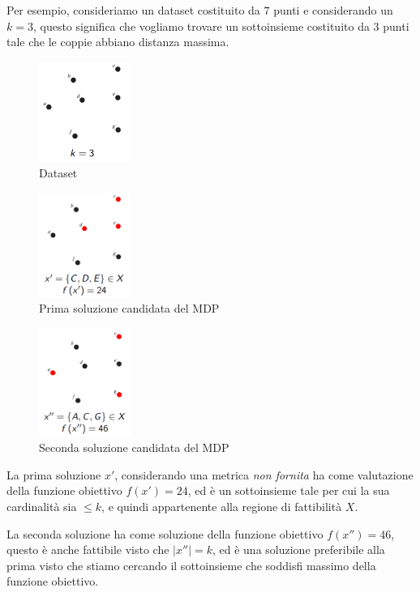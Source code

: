 \documentclass{article}
\begin{document}
Per esempio, consideriamo un dataset costituito da $7$ punti e considerando un $k=3$, questo significa che vogliamo trovare
un sottoinsieme costituito da $3$ punti tale che le coppie abbiano distanza massima.

\begin{figure}[H]
    \centering
    \includegraphics[width=3cm]{images/graph_MDP.png}
    \caption{Dataset}
    \label{fig:graph_MDP}
\end{figure}

\begin{figure}[H]
    \centering
    \includegraphics[width=3cm]{images/sol1_MDP.png}
    \caption{Prima soluzione candidata del MDP}
    \label{fig:cand_sol_MDP}
\end{figure}

\begin{figure}[H]
    \centering
    \includegraphics[width=3cm]{images/sol_MDP.png}
    \caption{Seconda soluzione candidata del MDP}
    \label{fig:cand_sol_2_MDP}
\end{figure}

La prima soluzione $x'$, considerando una metrica \textit{non fornita} ha come valutazione della funzione obiettivo $f(x')=24$, ed è un sottoinsieme tale per cui
la sua cardinalità sia $\leq k$, e quindi appartenente alla regione di fattibilità $X$.

La seconda soluzione ha come soluzione della funzione obiettivo $f(x'')=46$, questo è anche fattibile visto che $|x''|=k$, ed è una soluzione preferibile alla prima visto che
stiamo cercando il sottoinsieme che soddisfi massimo della funzione obiettivo.
\end{document}
